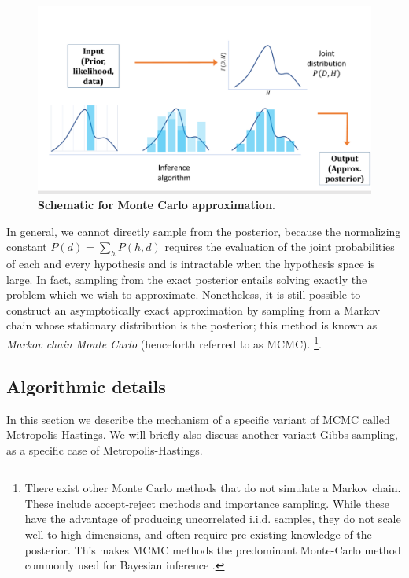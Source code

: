\begin{figure}
\centering
\includegraphics[width = \textwidth]{figures/MonteCarlo_schematic.pdf}
\caption{\textbf{Schematic for Monte Carlo approximation}. }
\label{fig:MC_schematic}
\end{figure}

In general, we cannot directly sample from the posterior, because the normalizing constant $P(d) = \sum_{h} P(h,d)$ requires the evaluation of the joint probabilities of each and every hypothesis and is intractable when the hypothesis space is large. In fact, sampling from the exact posterior entails solving exactly the problem which we wish to approximate. Nonetheless, it is still possible to construct an asymptotically exact approximation by sampling from a Markov chain whose stationary distribution is the posterior; this method is known as \emph{Markov chain Monte Carlo} (henceforth referred to as MCMC). \footnote{There exist other Monte Carlo methods that do not simulate a Markov chain. These include accept-reject methods and importance sampling. While these have the advantage of producing uncorrelated i.i.d. samples, they do not scale well to high dimensions, and often require pre-existing knowledge of the posterior. This makes MCMC methods the predominant Monte-Carlo method commonly used for Bayesian inference \cite{neal1993probabilistic, andrieu2003introduction}.}.

\subsection{Algorithmic details}

In this section we describe the mechanism of a specific variant of MCMC called Metropolis-Hastings. We will briefly also discuss another variant Gibbs sampling, as a specific case of Metropolis-Hastings.

